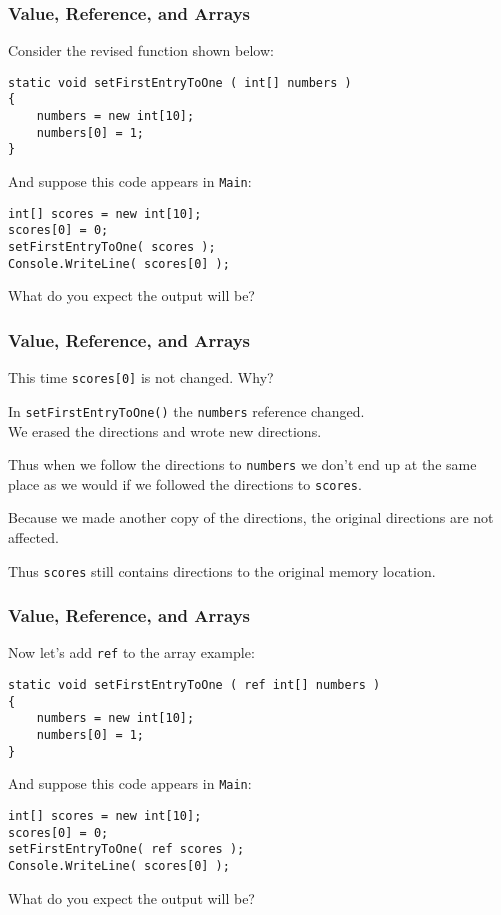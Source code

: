 \begin{frame}[fragile]
\frametitle{Value, Reference, and Arrays}

Consider the revised function shown below:

\begin{verbatim}
static void setFirstEntryToOne ( int[] numbers )
{
    numbers = new int[10];
    numbers[0] = 1;
}
\end{verbatim}

And suppose this code appears in \texttt{Main}:
\begin{verbatim}
int[] scores = new int[10];
scores[0] = 0;
setFirstEntryToOne( scores );
Console.WriteLine( scores[0] );
\end{verbatim}

What do you expect the output will be?

\end{frame}

\begin{frame}
\frametitle{Value, Reference, and Arrays}
This time \texttt{scores[0]} is not changed. Why?

In \texttt{setFirstEntryToOne()} the \texttt{numbers} reference changed.\\
\quad We erased the directions and wrote new directions. 

Thus when we follow the directions to \texttt{numbers} we don't end up at the same place as we would if we followed the directions to \texttt{scores}.

Because we made another copy of the directions, the original directions are not affected.

Thus \texttt{scores} still contains directions to the original memory location.

\end{frame}

\begin{frame}[fragile]
\frametitle{Value, Reference, and Arrays}

Now let's add \texttt{ref} to the array example:

\begin{verbatim}
static void setFirstEntryToOne ( ref int[] numbers )
{
    numbers = new int[10];
    numbers[0] = 1;
}
\end{verbatim}

And suppose this code appears in \texttt{Main}:
\begin{verbatim}
int[] scores = new int[10];
scores[0] = 0;
setFirstEntryToOne( ref scores );
Console.WriteLine( scores[0] );
\end{verbatim}

What do you expect the output will be?

\end{frame}

